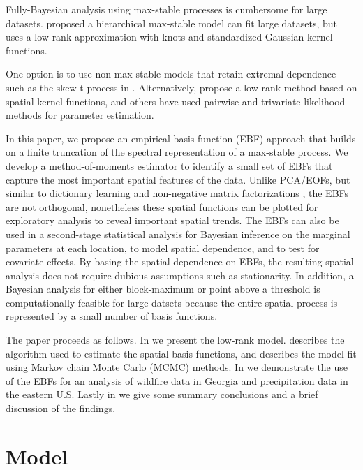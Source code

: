 \documentclass[11pt]{article}
\begin{document}
Fully-Bayesian analysis using max-stable processes is cumbersome for large datasets.
\citet{Reich2012} proposed a hierarchical max-stable model can fit large datasets, but uses a low-rank approximation with knots and standardized Gaussian kernel functions.
\citet{Thibaud2015}


One option is to use non-max-stable models that retain extremal dependence such as the skew-t process in \citep{Morris2016}.
Alternatively, \citet{Reich2012} propose a low-rank method based on spatial kernel functions, and others have used pairwise \citep{Padoan2010,Huser2014} and trivariate \citep{Genton2011} likelihood methods for parameter estimation.

In this paper, we propose an empirical basis function (EBF) approach that builds on a finite truncation of the spectral representation of a max-stable process.
We develop a method-of-moments estimator to identify a small set of EBFs that capture the most important spatial features of the data.
Unlike PCA/EOFs, but similar to dictionary learning \citep{Mairal2014} and non-negative matrix factorizations \citep{Lee1999}, the EBFs are not orthogonal, nonetheless these spatial functions can be plotted for exploratory analysis to reveal important spatial trends.
The EBFs can also be used in a second-stage statistical analysis for Bayesian inference on the marginal parameters at each location, to model spatial dependence, and to test for covariate effects.
By basing the spatial dependence on EBFs, the resulting spatial analysis does not require dubious assumptions such as stationarity.
In addition, a Bayesian analysis for either block-maximum or point above a threshold is computationally feasible for large datsets because the entire spatial process is represented by a small number of basis functions.

The paper proceeds as follows. In  we present the low-rank model.  describes the algorithm used to estimate the spatial basis functions, and  describes the model fit using Markov chain Monte Carlo (MCMC) methods. In  we demonstrate the use of the EBFs for an analysis of wildfire data in Georgia and precipitation data in the eastern U.S. Lastly in  we give some summary conclusions and a brief discussion of the findings.

\section{Model}\label{ebs:model}
\end{document}
